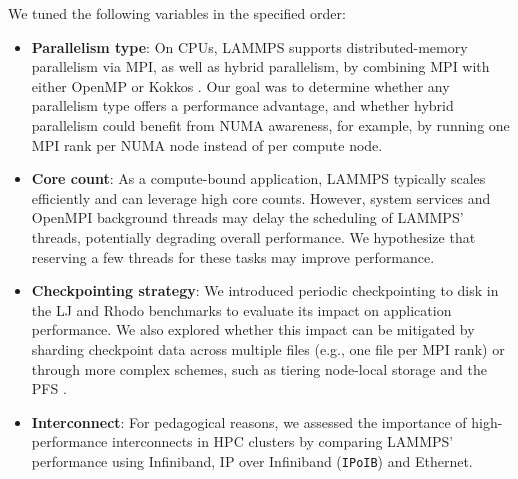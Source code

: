 \documentclass[sigplan, nonacm, screen]{acmart}
\begin{document}
We tuned the following variables in the specified order:

\begin{itemize}
    \item \textbf{Parallelism type}: On CPUs, LAMMPS supports distributed-memory parallelism via
                                     MPI, as well as hybrid parallelism, by combining MPI with
                                     either OpenMP or Kokkos \cite{lammps-accelerators}. Our goal
                                     was to determine whether any parallelism type offers a
                                     performance advantage, and whether hybrid parallelism could
                                     benefit from NUMA awareness, for example, by running one MPI
                                     rank per NUMA node instead of per compute node.

    \item \textbf{Core count}: As a compute-bound application, LAMMPS typically scales efficiently
                               and can leverage high core counts. However, system services and
                               OpenMPI background threads may delay the scheduling of LAMMPS'
                               threads, potentially degrading overall performance. We hypothesize
                               that reserving a few threads for these tasks may improve performance.

    \item \textbf{Checkpointing strategy}: We introduced periodic checkpointing to disk in the LJ
                                           and Rhodo benchmarks to evaluate its impact on
                                           application performance. We also explored whether this
                                           impact can be mitigated by sharding checkpoint data
                                           across multiple files (e.g., one file per MPI rank) or
                                           through more complex schemes, such as tiering node-local
                                           storage and the PFS
                                           \cite{tiered-llm-checkpointing, hacc}.

    \item \textbf{Interconnect}: For pedagogical reasons, we assessed the importance of
                                 high-performance interconnects in HPC clusters by comparing LAMMPS'
                                 performance using Infiniband, IP over Infiniband (\texttt{IPoIB})
                                 and Ethernet.
\end{itemize}
\end{document}

